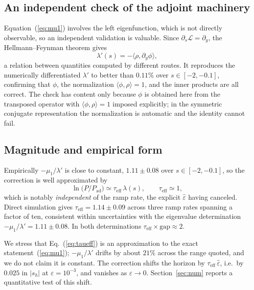 \documentclass[%
 aip,
 cha,
 amsmath,amssymb,
 reprint,
 superscriptaddress,
 floatfix,
]{revtex4-2}
\newcommand{\Leff}{\mathcal{L}}
\newcommand{\Sig}{\hat\varepsilon}
\begin{document}
\subsection{An independent check of the adjoint machinery}

Equation~(\ref{eq:mu1}) involves the left eigenfunction, which is not directly observable, so an independent validation is valuable.  Since $\partial_s\Leff=\partial_y$, the Hellmann--Feynman theorem gives
\begin{equation}
\label{eq:hf}
\lambda'(s)=-\langle\rho,\partial_y\phi\rangle,
\end{equation}
a relation between quantities computed by different routes.  It reproduces the numerically differentiated $\lambda'$ to better than $0.11\%$ over $s\in[-2,-0.1]$, confirming that $\phi$, the normalization $\langle\phi,\rho\rangle=1$, and the inner products are all correct.  The check has content only because $\phi$ is obtained here from the transposed operator with $\langle\phi,\rho\rangle=1$ imposed explicitly; in the symmetric conjugate representation the normalization is automatic and the identity cannot fail.

\subsection{Magnitude and empirical form}

Empirically $-\mu_1/\lambda'$ is close to constant, $1.11\pm0.08$ over $s\in[-2,-0.1]$, so the correction is well approximated by
\begin{equation}
\label{eq:taueff}
\ln\bigl(P/P_{\mathrm{ad}}\bigr)\simeq\tau_{\mathrm{eff}}\,\lambda(s),\qquad \tau_{\mathrm{eff}}\simeq1,
\end{equation}
which is notably \emph{independent} of the ramp rate, the explicit $\Sig$ having canceled.  Direct simulation gives $\tau_{\mathrm{eff}}=1.14\pm0.09$ across three ramp rates spanning a factor of ten, consistent within uncertainties with the eigenvalue determination $-\mu_1/\lambda'=1.11\pm0.08$.  In both determinations $\tau_{\mathrm{eff}}\times\text{gap}\approx2$.

We stress that Eq.~(\ref{eq:taueff}) is an approximation to the exact statement~(\ref{eq:mu1}); $-\mu_1/\lambda'$ drifts by about $21\%$ across the range quoted, and we do not claim it is constant.  The correction shifts the horizon by $\tau_{\mathrm{eff}}\,\Sig$, i.e.\ by $0.025$ in $|s_h|$ at $\varepsilon=10^{-3}$, and vanishes as $\varepsilon\to0$.  Section~\ref{sec:num} reports a quantitative test of this shift.
\end{document}
